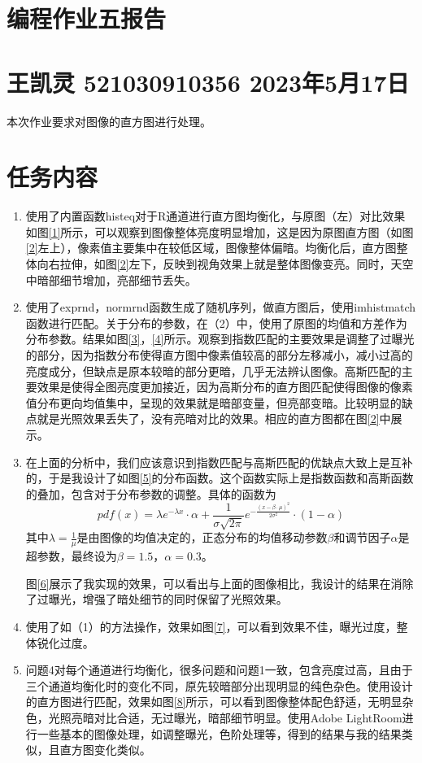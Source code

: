 \documentclass[a4paper]{article}
\begin{document}
	\section*{\Huge 编程作业五报告}
	\section*{\small 王凯灵 521030910356 2023年5月17日}
	本次作业要求对图像的直方图进行处理。
	\section*{任务内容}
	\begin{enumerate}
		\item 使用了内置函数histeq对于R通道进行直方图均衡化，与原图（左）对比效果如图\ref{1}所示，可以观察到图像整体亮度明显增加，这是因为原图直方图（如图\ref{2}左上），像素值主要集中在较低区域，图像整体偏暗。均衡化后，直方图整体向右拉伸，如图\ref{2}左下，反映到视角效果上就是整体图像变亮。同时，天空中暗部细节增加，亮部细节丢失。
		\item 使用了exprnd，normrnd函数生成了随机序列，做直方图后，使用imhistmatch函数进行匹配。关于分布的参数，在（2）中，使用了原图的均值和方差作为分布参数。结果如图\ref{3}，\ref{4}所示。观察到指数匹配的主要效果是调整了过曝光的部分，因为指数分布使得直方图中像素值较高的部分左移减小，减小过高的亮度成分，但缺点是原本较暗的部分更暗，几乎无法辨认图像。高斯匹配的主要效果是使得全图亮度更加接近，因为高斯分布的直方图匹配使得图像的像素值分布更向均值集中，呈现的效果就是暗部变量，但亮部变暗。比较明显的缺点就是光照效果丢失了，没有亮暗对比的效果。相应的直方图都在图\ref{2}中展示。
		\item 在上面的分析中，我们应该意识到指数匹配与高斯匹配的优缺点大致上是互补的，于是我设计了如图\ref{5}的分布函数。这个函数实际上是指数函数和高斯函数的叠加，包含对于分布参数的调整。具体的函数为
		\begin{equation}
			pdf(x) = \lambda e^{- \lambda x} \cdot \alpha + \frac{1}{\sigma \sqrt{2 \pi}} e^{ -\frac{(x - \beta\cdot\mu)^2}{2 \sigma^2} } \cdot (1-\alpha)
		\end{equation}
		其中$\lambda=\frac{1}{\mu}$是由图像的均值决定的，正态分布的均值移动参数$\beta$和调节因子$\alpha$是超参数，最终设为$\beta=1.5$，$\alpha=0.3$。
		
		图\ref{6}展示了我实现的效果，可以看出与上面的图像相比，我设计的结果在消除了过曝光，增强了暗处细节的同时保留了光照效果。
		\item 使用了如（1）的方法操作，效果如图\ref{7}，可以看到效果不佳，曝光过度，整体锐化过度。
		\item 问题4对每个通道进行均衡化，很多问题和问题1一致，包含亮度过高，且由于三个通道均衡化时的变化不同，原先较暗部分出现明显的纯色杂色。使用设计的直方图进行匹配，效果如图\ref{8}所示，可以看到图像整体配色舒适，无明显杂色，光照亮暗对比合适，无过曝光，暗部细节明显。使用Adobe LightRoom进行一些基本的图像处理，如调整曝光，色阶处理等，得到的结果与我的结果类似，且直方图变化类似。
	\end{enumerate}
\end{document}
